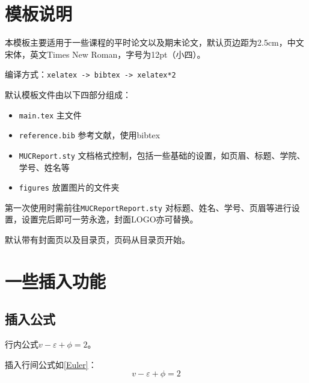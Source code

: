 \documentclass[12pt,hyperref,a4paper,UTF8]{ctexart}
\begin{document}
\cover
%
%

\thispagestyle{empty} %

\newpage
\tableofcontents
\thispagestyle{empty} %

\newpage
\setcounter{page}{1} %


\section{模板说明}
本模板主要适用于一些课程的平时论文以及期末论文，默认页边距为2.5cm，中文宋体，英文Times New Roman，字号为12pt（小四）。

编译方式：\verb|xelatex -> bibtex -> xelatex*2|


默认模板文件由以下四部分组成：
\begin{itemize}
    \item \texttt{main.tex} 主文件
    \item \texttt{reference.bib} 参考文献，使用bibtex
    \item \texttt{MUCReport.sty} 文档格式控制，包括一些基础的设置，如页眉、标题、学院、学号、姓名等
    \item \texttt{figures} 放置图片的文件夹
\end{itemize}

第一次使用时需前往\texttt{MUCReportReport.sty} 对标题、姓名、学号、页眉等进行设置，设置完后即可一劳永逸，封面LOGO亦可替换。

默认带有封面页以及目录页，页码从目录页开始。

\section{一些插入功能}
\subsection{插入公式}
行内公式$v-\varepsilon+\phi=2$。

插入行间公式如\autoref{Euler}：
\begin{equation}
    v-\varepsilon+\phi=2
    \label{Euler}
\end{equation}
\end{document}
